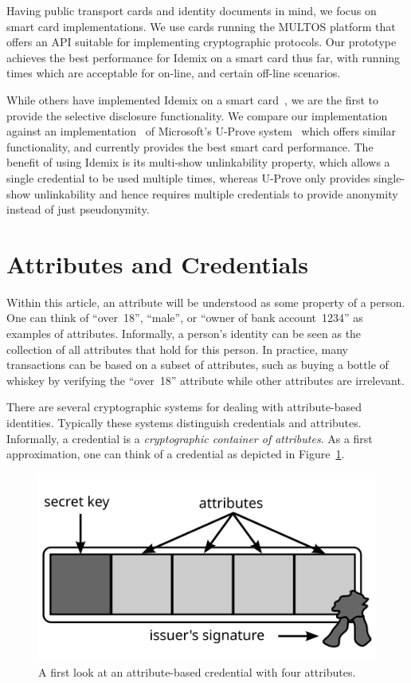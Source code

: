 Having public transport cards and identity documents in mind, we focus on smart
card implementations. We use cards running the MULTOS platform that offers an
API suitable for implementing cryptographic protocols. Our prototype achieves
the best performance for Idemix on a smart card thus far, with running times
which are acceptable for on-line, and certain off-line scenarios.

While others have implemented Idemix on a smart
card~\cite{BichselCGS2009,Sterckx09}, we are the first to provide the selective
disclosure functionality. We compare our implementation against an
implementation~\cite{MostowskiVullers11} of Microsoft's U-Prove
system~\cite{Brands2000,U-Prove_Crypto2011} which offers similar functionality,
and currently provides the best smart card performance. The benefit of using
Idemix is its multi-show unlinkability property, which allows a single
credential to be used multiple times, whereas U-Prove only provides single-show
unlinkability and hence requires multiple credentials to provide anonymity
instead of just pseudonymity.


\section{Attributes and Credentials}

Within this article, an attribute will be understood as some property of a
person. One can think of ``over~18'', ``male'', or ``owner of bank
account~1234'' as examples of attributes. Informally, a person's identity can be
seen as the collection of all attributes that hold for this person. In practice,
many transactions can be based on a subset of attributes, such as buying a
bottle of whiskey by verifying the ``over~18'' attribute while other attributes
are irrelevant.

There are several cryptographic systems for dealing with attribute-based
identities. Typically these systems distinguish credentials and attributes.
Informally, a credential is a \emph{cryptographic container of attributes}. As
a first approximation, one can think of a credential as depicted in
Figure~\ref{fig:Credential}.

\begin{figure}
  \centering
  \includegraphics[scale=.45]{images/credential}
  \caption{A first look at an attribute-based credential with four attributes.}
  \label{fig:Credential}
\end{figure}

